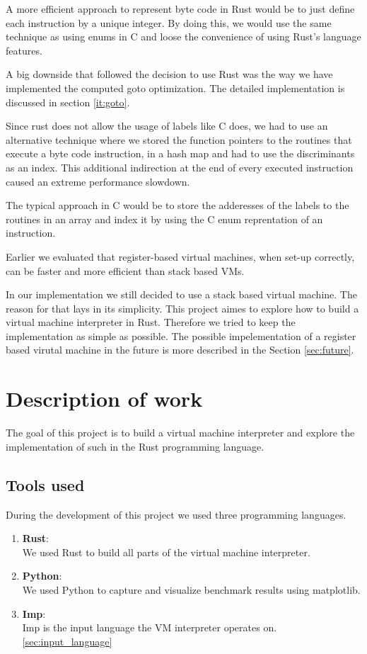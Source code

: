\documentclass{article}
\begin{document}
A more efficient approach to represent byte code in Rust would be to just
define each instruction by a unique integer. By doing this, we would use the
same technique as using enums in C and loose the convenience of using Rust's
language features.
 
A big downside that followed the decision to use Rust was the way we have
implemented the computed goto optimization. The detailed implementation is
discussed in section \ref{it:goto}.

Since rust does not allow the usage of labels like C does, we had to use an
alternative technique where we stored the function pointers to the routines
that execute a byte code instruction, in a hash map and had to use the
discriminants as an index. This additional indirection at the end of every 
executed instruction caused an extreme performance slowdown.

The typical approach in C would be to store the adderesses of the labels to the
routines in an array and index it by using the C enum reprentation of an
instruction.

Earlier we evaluated that register-based virtual machines, when set-up
correctly, can be faster and more efficient than stack based VMs.

In our implementation we still decided to use a stack based virtual machine.
The reason for that lays in its simplicity. This project aimes to explore
how to build a virtual machine interpreter in Rust. Therefore we tried to
keep the implementation as simple as possible. The possible impelementation of
a register based virutal machine in the future is more described in the Section
\ref{sec:future}.

\section{Description of work}
The goal of this project is to build a virtual machine interpreter and 
explore the implementation of such in the Rust programming language.

\subsection{Tools used}
During the development of this project we used three programming languages. 

\begin{enumerate}
    \item \textbf{Rust}:\\
        We used Rust to build all parts of the virtual machine interpreter.
    \item \textbf{Python}:\\
        We used Python to capture and visualize benchmark results using matplotlib.
    \item \textbf{Imp}:\\
        Imp is the input language the VM interpreter operates on. \ref{sec:input_language}
\end{enumerate}
\end{document}
